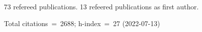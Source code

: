 73 refereed publications. 13 refeered publications as first author.

Total citations~=~2688; h-index~=~27 (2022-07-13)